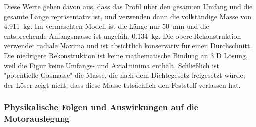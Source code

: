\documentclass[oneside,openany]{amsdtx}
\begin{document}
Diese Werte gehen davon aus, dass das Profil über den gesamten Umfang und die gesamte Länge repräsentativ ist, und verwenden dann die vollständige  Masse von \SI{4.911}{kg}. Im vermaschten Modell ist die Länge nur \SI{50}{mm} und die entsprechende Anfangsmasse ist ungefähr \SI{0.134}{kg}. Die obere Rekonstruktion verwendet radiale Maxima und ist absichtlich konservativ für einen Durchschnitt. Die niedrigere Rekonstruktion ist keine mathematische Bindung an 3 D Lösung, weil die Figur keine Umfangs- und Axialminima enthält. Schließlich ist "potentielle Gasmasse" die Masse, die nach dem Dichtegesetz freigesetzt würde; der Löser zeigt nicht, dass diese Masse tatsächlich den Feststoff verlassen hat.

\subsubsection{Physikalische Folgen und Auswirkungen auf die Motorauslegung}
\end{document}
